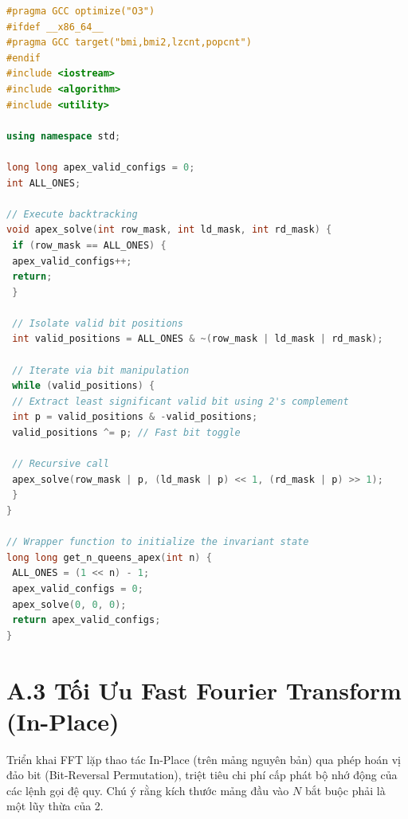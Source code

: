 \documentclass[11pt, letterpaper]{report}
\begin{document}
\begin{lstlisting}[language=C++, caption={Bitmasking via CPU Intrinsics}]
#pragma GCC optimize("O3")
#ifdef __x86_64__
#pragma GCC target("bmi,bmi2,lzcnt,popcnt")
#endif
#include <iostream>
#include <algorithm>
#include <utility>

using namespace std;

long long apex_valid_configs = 0;
int ALL_ONES;

// Execute backtracking
void apex_solve(int row_mask, int ld_mask, int rd_mask) {
 if (row_mask == ALL_ONES) {
 apex_valid_configs++;
 return;
 }
 
 // Isolate valid bit positions
 int valid_positions = ALL_ONES & ~(row_mask | ld_mask | rd_mask);
 
 // Iterate via bit manipulation
 while (valid_positions) {
 // Extract least significant valid bit using 2's complement
 int p = valid_positions & -valid_positions;
 valid_positions ^= p; // Fast bit toggle
 
 // Recursive call
 apex_solve(row_mask | p, (ld_mask | p) << 1, (rd_mask | p) >> 1);
 }
}

// Wrapper function to initialize the invariant state
long long get_n_queens_apex(int n) {
 ALL_ONES = (1 << n) - 1;
 apex_valid_configs = 0;
 apex_solve(0, 0, 0);
 return apex_valid_configs;
}
\end{lstlisting}

\section*{A.3 Tối Ưu Fast Fourier Transform (In-Place)}
Triển khai FFT lặp thao tác In-Place (trên mảng nguyên bản) qua phép hoán vị đảo bit (Bit-Reversal Permutation), triệt tiêu chi phí cấp phát bộ nhớ động của các lệnh gọi đệ quy. Chú ý rằng kích thước mảng đầu vào $N$ bắt buộc phải là một lũy thừa của 2.
\end{document}
